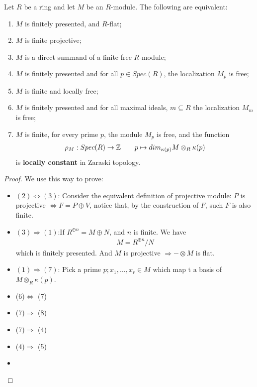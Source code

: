 \documentclass[Total.tex]{subfiles}
\begin{document}
			\begin{lemma}
				Let $R$ be a ring and let $M$ be an $R$-module. The following are equivalent:
				\begin{enumerate}
					\item $M$ is finitely presented, and $R$-flat;
					\item $M$ is finite projective;
					\item $M$ is a direct summand of a finite free $R$-module;
					\item $M$ is finitely presented and for all $p\in Spec(R)$, the localization $M_p$ is free;
					\item $M$ is finite and locally free;
					\item $M$ is finitely presented and for all maximal ideals, $m\subseteq R$ the localization $M_m$ is free;
					\item $M$ is finite, for every prime $p$, the module $M_p$ is free, and the function
					\begin{gather*}
						\rho_M:Spec(R)\rightarrow \mathbb{Z}\qquad p\mapsto dim_{\kappa(p)} M\otimes_R \kappa(p)
					\end{gather*}
					is \textbf{locally constant} in Zaraski topology.
				\end{enumerate}
			\end{lemma}
			\begin{proof}
				We use this way to prove:
				\begin{center}
				\end{center}
				\begin{itemize}
					\item $(2)\Leftrightarrow (3)$: Consider the equivalent definition of projective module: $P$ is projective $\Leftrightarrow F=P\oplus V$, notice that, by the construction of $F$, such $F$ is also finite.
					\item $(3)\Rightarrow (1)$:If $R^{\oplus n}=M\oplus N$, and $n$ is finite. We have
					\begin{gather*}
						M=R^{\oplus n}/N
					\end{gather*}
					which is finitely presented. And $M$ is projective $\Rightarrow -\otimes M$ is flat.  
					\item $(1)\Rightarrow (7)$: Pick a prime $p;x_1,\dots,x_r\in M$ which map t a basis of $M\otimes_R \kappa(p)$.
					\item (6)$\Leftrightarrow$ (7)
					\item (7)$\Rightarrow$ (8)
					\item (7)$\Rightarrow$ (4)
					\item (4)$\Rightarrow$ (5)
					\item 
				\end{itemize}
			\end{proof}
			
\end{document}
